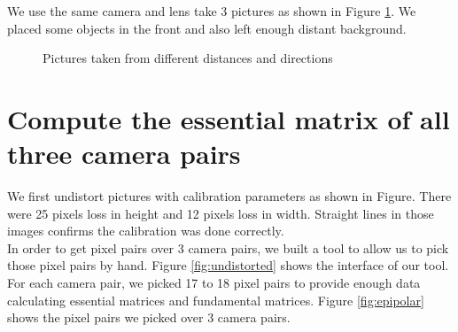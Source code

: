 \documentclass[10pt,twocolumn,letterpaper]{article}
\begin{document}
We use the same camera and lens take 3 pictures as shown in Figure \ref{fig:pictures}. We placed some objects in the front and also left enough distant background.
\begin{figure}[t]
\centering
{}

\caption{Pictures taken from different distances and directions}
\label{fig:pictures}
\end{figure}

\section{Compute the essential matrix of all three camera pairs}

We first undistort pictures with calibration parameters as shown in Figure. There were 25 pixels loss in height and 12 pixels loss in width. Straight lines in those images confirms the calibration was done correctly.\\

In order to get pixel pairs over 3 camera pairs, we built a tool to allow us to pick those pixel pairs by hand. Figure \ref{fig:undistorted} shows the interface of our tool.\\

For each camera pair, we picked 17 to 18 pixel pairs to provide enough data calculating essential matrices and fundamental matrices. Figure \ref{fig:epipolar} shows the pixel pairs we picked over 3 camera pairs.\\
\end{document}
